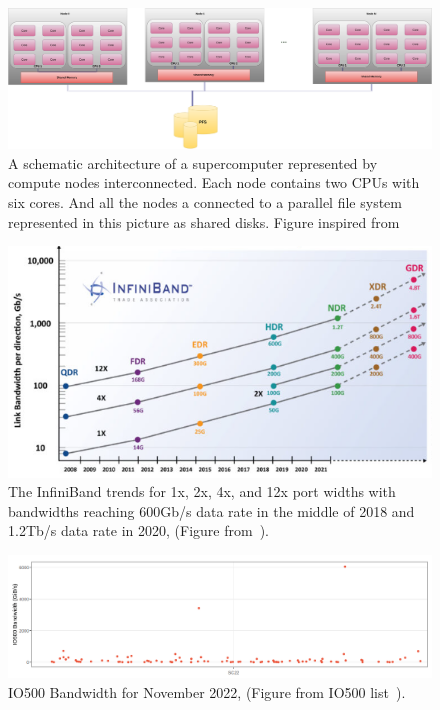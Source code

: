 \begin{figure}[h!]\centering
\includegraphics[scale=0.25]{figures/supercomputer.pdf}
\caption{A schematic architecture of a supercomputer represented by compute nodes interconnected. Each node contains two CPUs with six cores. And all the nodes a connected to a parallel file system represented in this picture as shared disks. Figure inspired from~\cite{yan_comparison_2018}}
\label{figarchisuper}
\end{figure}

\begin{figure}[h!]\centering
\includegraphics[scale=0.5]{figures/infiniband.png}
\caption{The InfiniBand trends for 1x, 2x, 4x, and 12x port widths with bandwidths reaching 600Gb/s data rate in the middle of 2018 and 1.2Tb/s data rate in 2020, (Figure from~\cite{infiniband}).}
\label{figinfiniband}
\end{figure}


\begin{figure}[ht]\centering
\includegraphics[scale=0.3]{figures/top500.db.png}
\caption{IO500 Bandwidth for November 2022, (Figure from IO500 list~\cite{io500}).}
\label{figioBW}
\end{figure}

